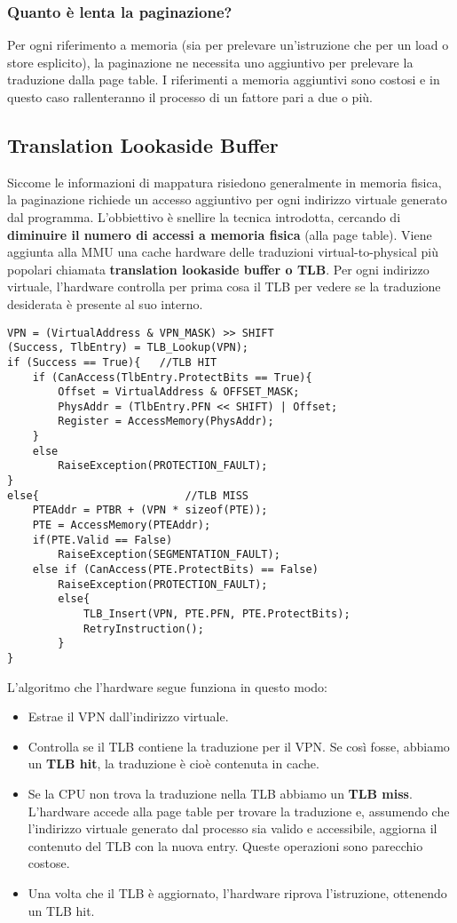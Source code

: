\documentclass[12pt, twoside, letterpaper]{article}
\begin{document}
			\subsubsection{Quanto è lenta la paginazione?}
				Per ogni riferimento a memoria (sia per prelevare un'istruzione che per un load o store esplicito), la paginazione ne necessita uno aggiuntivo per prelevare la traduzione dalla page table. I riferimenti a memoria aggiuntivi sono costosi e in questo caso rallenteranno il processo di un fattore pari a due o più.
				
		\subsection{Translation Lookaside Buffer}
			Siccome le informazioni di mappatura risiedono generalmente in memoria fisica, la paginazione richiede un accesso aggiuntivo per ogni indirizzo virtuale generato dal programma. L'obbiettivo è snellire la tecnica introdotta, cercando di \textbf{diminuire il numero di accessi a memoria fisica }(alla page table). Viene aggiunta alla MMU una cache hardware delle traduzioni virtual-to-physical più popolari chiamata \textbf{translation lookaside buffer  o TLB}. Per ogni indirizzo virtuale, l'hardware controlla per prima cosa il TLB per vedere se la traduzione desiderata è presente al suo interno. 
			\begin{lstlisting}[style=CStyle]
VPN = (VirtualAddress & VPN_MASK) >> SHIFT
(Success, TlbEntry) = TLB_Lookup(VPN);
if (Success == True){	//TLB HIT
	if (CanAccess(TlbEntry.ProtectBits == True){
		Offset = VirtualAddress & OFFSET_MASK;
		PhysAddr = (TlbEntry.PFN << SHIFT) | Offset;
		Register = AccessMemory(PhysAddr);				
	}
	else
		RaiseException(PROTECTION_FAULT);
}	
else{						//TLB MISS
	PTEAddr = PTBR + (VPN * sizeof(PTE));	
	PTE = AccessMemory(PTEAddr);
	if(PTE.Valid == False)
		RaiseException(SEGMENTATION_FAULT);
	else if (CanAccess(PTE.ProtectBits) == False)
		RaiseException(PROTECTION_FAULT);
		else{
			TLB_Insert(VPN, PTE.PFN, PTE.ProtectBits);
			RetryInstruction();
		}								
}			\end{lstlisting}
			L'algoritmo che l'hardware segue funziona in questo modo: 
			\begin{itemize}
				\item Estrae il VPN dall'indirizzo virtuale.
				\item Controlla se il TLB contiene la traduzione per il VPN. Se così fosse, abbiamo un \textbf{TLB hit}, la traduzione è cioè contenuta in cache.
				\item Se la CPU non trova la traduzione nella TLB abbiamo un \textbf{TLB miss}. L'hardware accede alla page table per trovare la traduzione e, assumendo che l'indirizzo virtuale generato dal processo sia valido e accessibile, aggiorna il contenuto del TLB con la nuova entry. Queste operazioni sono parecchio costose.
				\item Una volta che il TLB è aggiornato, l'hardware riprova l'istruzione, ottenendo un TLB hit.
			\end{itemize}
			
\end{document}
